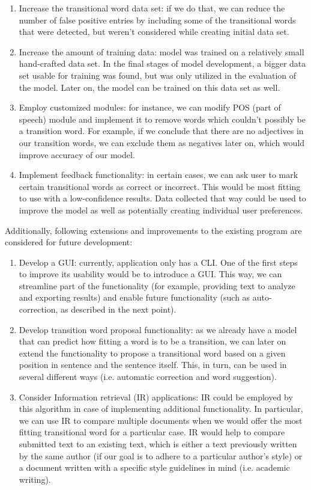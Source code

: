 \begin{enumerate}
    \item Increase the transitional word data set: if we do that, we can reduce the number of false positive entries by including some of the transitional words that were detected, but weren't considered while creating initial data set.
    \item Increase the amount of training data: model was trained on a relatively small hand-crafted data set. In the final stages of model development, a bigger data set usable for training was found, but was only utilized in the evaluation of the model. Later on, the model can be trained on this data set as well.
    \item Employ customized modules: for instance, we can modify POS (part of speech) module and implement it to remove words which couldn't possibly be a transition word. For example, if we conclude that there are no adjectives in our transition words, we can exclude them as negatives later on, which would improve accuracy of our model.
    \item Implement feedback functionality: in certain cases, we can ask user to mark certain transitional words as correct or incorrect. This would be most fitting to use with a low-confidence results. Data collected that way could be used to improve the model as well as potentially creating individual user preferences.
\end{enumerate}

Additionally, following extensions and improvements to the existing program are considered for future development:

\begin{enumerate}
    \item Develop a GUI: currently, application only has a CLI. One of the first steps to improve its usability would be to introduce a GUI. This way, we can streamline part of the functionality (for example, providing text to analyze and exporting results) and enable future functionality (such as auto-correction, as described in the next point).
    \item Develop transition word proposal functionality: as we already have a model that can predict how fitting a word is to be a transition, we can later on extend the functionality to propose a transitional word based on a given position in sentence and the sentence itself. This, in turn, can be used in several different ways (i.e. automatic correction and word suggestion).
    \item Consider Information retrieval (IR) applications: IR could be employed by this algorithm in case of implementing additional functionality. In particular, we can use IR to compare multiple documents when we would offer the most fitting transitional word for a particular case. IR would help to compare submitted text to an existing text, which is either a text previously written by the same author (if our goal is to adhere to a particular author's style) or a document written with a specific style guidelines in mind (i.e. academic writing).
\end{enumerate}

